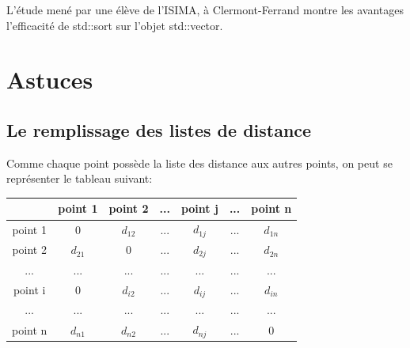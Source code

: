 \documentclass[stage2a]{tnreport}
\begin{document}
L'étude\cite{PerfSort} mené par une élève de l'ISIMA, à Clermont-Ferrand montre les avantages l'efficacité de std::sort sur l'objet std::vector.



\section{Astuces}


\subsection{Le remplissage des listes de distance}
Comme chaque point possède la liste des distance aux autres points, on peut se représenter le tableau suivant:\\
\hspace*{3cm}
\begin{tabular}{c|cccccc}
   & point 1 & point 2 & ... & point j & ... & point n \\
  \hline
  point 1 & 0 & \begin{math} d_{12} \end{math} & ... & \begin{math} d_{1j} \end{math} & ... & \begin{math} d_{1n} \end{math} \\
  point 2 & \begin{math} d_{21} \end{math} & 0 & ... & \begin{math} d_{2j} \end{math} & ... & \begin{math} d_{2n} \end{math}\\
  ... & ... & ... &  ...  & ... & ... & ... \\
  point i & 0 & \begin{math} d_{i2} \end{math} & ... & \begin{math} d_{ij} \end{math} & ... & \begin{math} d_{in} \end{math} \\
   ... & ... & ... & ... & ... & ... & ... \\
  point n & \begin{math} d_{n1} \end{math} & \begin{math} d_{n2} \end{math} & ... & \begin{math} d_{nj} \end{math} & ... & 0 \\
\end{tabular}
\end{document}
